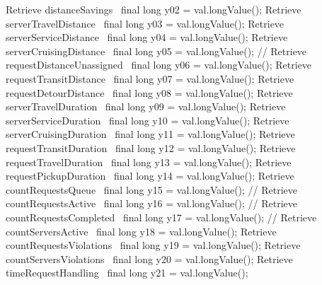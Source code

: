      \LA{}Retrieve distanceSavings~{\nwtagstyle{}}\RA{}           final long y02 = val.longValue();
      \LA{}Retrieve serverTravelDistance~{\nwtagstyle{}}\RA{}      final long y03 = val.longValue();
      \LA{}Retrieve serverServiceDistance~{\nwtagstyle{}}\RA{}     final long y04 = val.longValue();
      \LA{}Retrieve serverCruisingDistance~{\nwtagstyle{}}\RA{}    final long y05 = val.longValue();
//      \LA{}Retrieve requestDistanceUnassigned~{\nwtagstyle{}}\RA{} final long y06 = val.longValue();
      \LA{}Retrieve requestTransitDistance~{\nwtagstyle{}}\RA{}    final long y07 = val.longValue();
      \LA{}Retrieve requestDetourDistance~{\nwtagstyle{}}\RA{}     final long y08 = val.longValue();
      \LA{}Retrieve serverTravelDuration~{\nwtagstyle{}}\RA{}      final long y09 = val.longValue();
      \LA{}Retrieve serverServiceDuration~{\nwtagstyle{}}\RA{}     final long y10 = val.longValue();
      \LA{}Retrieve serverCruisingDuration~{\nwtagstyle{}}\RA{}    final long y11 = val.longValue();
      \LA{}Retrieve requestTransitDuration~{\nwtagstyle{}}\RA{}    final long y12 = val.longValue();
      \LA{}Retrieve requestTravelDuration~{\nwtagstyle{}}\RA{}     final long y13 = val.longValue();
      \LA{}Retrieve requestPickupDuration~{\nwtagstyle{}}\RA{}     final long y14 = val.longValue();
      \LA{}Retrieve countRequestsQueue~{\nwtagstyle{}}\RA{}        final long y15 = val.longValue();
//      \LA{}Retrieve countRequestsActive~{\nwtagstyle{}}\RA{}       final long y16 = val.longValue();
//      \LA{}Retrieve countRequestsCompleted~{\nwtagstyle{}}\RA{}    final long y17 = val.longValue();
//      \LA{}Retrieve countServersActive~{\nwtagstyle{}}\RA{}        final long y18 = val.longValue();
      \LA{}Retrieve countRequestsViolations~{\nwtagstyle{}}\RA{}   final long y19 = val.longValue();
      \LA{}Retrieve countServersViolations~{\nwtagstyle{}}\RA{}    final long y20 = val.longValue();
      \LA{}Retrieve timeRequestHandling~{\nwtagstyle{}}\RA{}       final long y21 = val.longValue();
